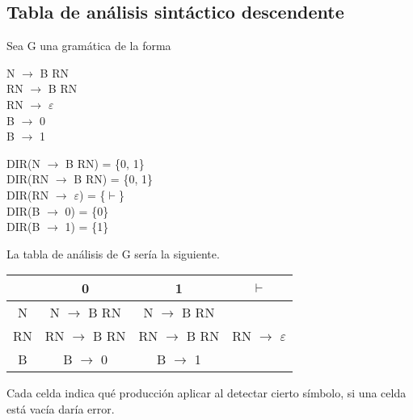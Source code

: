 \documentclass[\main/ApuntesPL.tex]{subfiles}
\begin{document}
    \subsection{Tabla de análisis sintáctico descendente}
      \par
      Sea G una gramática de la forma\\
      \begin{center}
        \begin{minipage}{.25\textwidth}
          \hspace*{5mm}N $\rightarrow$ B RN\\
          \hspace*{5mm}RN $\rightarrow$ B RN\\
          \hspace*{5mm}RN $\rightarrow$ $\varepsilon$\\
          \hspace*{5mm}B $\rightarrow$ 0\\
          \hspace*{5mm}B $\rightarrow$ 1
        \end{minipage}%
        \begin{minipage}{.75\textwidth}
          DIR(N $\rightarrow$ B RN) = \{0, 1\}\\
          DIR(RN $\rightarrow$ B RN) = \{0, 1\}\\
          DIR(RN $\rightarrow$ $\varepsilon$) = \{$\vdash$\}\\
          DIR(B $\rightarrow$ 0) = \{0\}\\
          DIR(B $\rightarrow$ 1) = \{1\}
        \end{minipage}
      \end{center}

      \bigskip
      \par
      La tabla de análisis de G sería la siguiente.
      \begin{center}
        \begin{minipage}{.6\textwidth}
          \begin{tabular}{||c c c c||}
            \hline
            & 0 & 1 & $\vdash$\\ [0.5ex]
            \hline\hline
            N & N $\rightarrow$ B RN & N $\rightarrow$ B RN &\\
            \hline
            RN & RN $\rightarrow$ B RN & RN $\rightarrow$ B RN & RN $\rightarrow$ $\varepsilon$\\
            \hline
            B & B $\rightarrow$ 0 & B $\rightarrow$ 1 &\\ [1ex]
            \hline
          \end{tabular}
        \end{minipage}%
        \begin{minipage}{.4\textwidth}
          \par
          Cada celda indica qué producción aplicar al detectar cierto símbolo, si una celda está
          vacía daría error.
        \end{minipage}
      \end{center}
\end{document}

